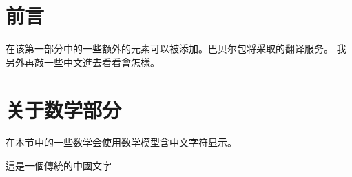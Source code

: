 \documentclass{article}
\begin{document}
 
\section{前言}
在该第一部分中的一些额外的元素可以被添加。巴贝尔包将采取的翻译服务。 我另外再敲一些中文進去看看會怎樣。
 
\section{关于数学部分}
在本节中的一些数学会使用数学模型含中文字符显示。
 
\vspace{0.5cm}
 
這是一個傳統的中國文字
\end{document}

